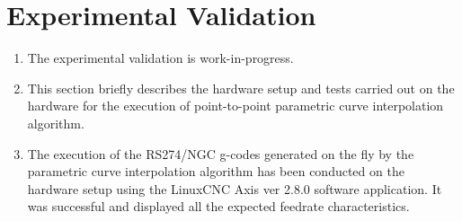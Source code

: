 \section{Experimental Validation}

\begin{enumerate}
\item The experimental validation is work-in-progress.

\item This section briefly describes the hardware setup and tests carried out on the hardware for the execution of point-to-point parametric curve interpolation algorithm.

\item The execution of the RS274/NGC g-codes generated on the fly by the parametric curve interpolation algorithm has been conducted on the hardware setup using the LinuxCNC Axis ver 2.8.0 software application. It was successful and displayed all the expected feedrate characteristics.

\end{enumerate}
